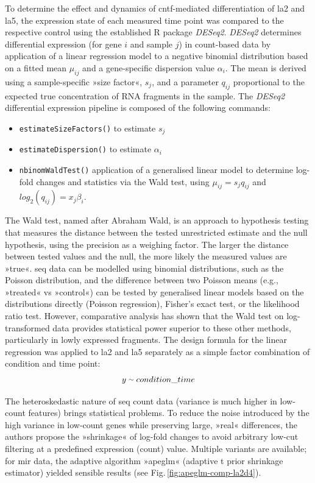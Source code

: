 \begin{method}
To determine the effect and dynamics of \ac{cntf}-mediated differentiation of \ac{la2} and \ac{la5}, the expression state of each measured time point was compared to the respective control using the established R package \textit{DESeq2}.\cite{Love2014} \textit{DESeq2} determines differential expression (for gene $i$ and sample $j$) in count-based data by application of a linear regression model to a negative binomial distribution based on a fitted mean $\mu_{ij}$ and a gene-specific dispersion value $\alpha_i$. The mean is derived using a sample-specific »size factor«, $s_j$, and a parameter $q_{ij}$ proportional to the expected true concentration of RNA fragments in the sample. The \textit{DESeq2} differential expression pipeline is composed of the following commands:
\begin{itemize}[noitemsep, leftmargin=.5cm, label={\tiny\raisebox{.5ex}{\textbullet}}]
\item \texttt{estimateSizeFactors()} to estimate $s_j$
\item \texttt{estimateDispersion()} to estimate $\alpha_i$
\item \texttt{nbinomWaldTest()} application of a generalised linear model to determine log-fold changes and statistics via the Wald test, using $\mu_{ij} = s_jq_{ij}$ and $log_2(q_{ij}) = x_j\beta_i$.
\end{itemize}
The Wald test, named after Abraham Wald,\cite{Wald1939} is an approach to hypothesis testing that measures the distance between the tested unrestricted estimate and the null hypothesis, using the precision as a weighing factor. The larger the distance between tested values and the null, the more likely the measured values are »true«. \ac{seq} data can be modelled using binomial distributions,\cite{Bullard2010} such as the Poisson distribution, and the difference between two Poisson means (e.g., »treated« vs »control«) can be tested by generalised linear models based on the distributions directly (Poisson regression), Fisher's exact test, or the likelihood ratio test. However, comparative analysis has shown that the Wald test on log-transformed data provides statistical power superior to these other methods,\cite{Chen2011} particularly in lowly expressed fragments. The design formula for the linear regression was applied to \ac{la2} and \ac{la5} separately as a simple factor combination of condition and time point: $$y \smallsim condition\_time$$

The heteroskedastic nature of \ac{seq} count data (variance is much higher in low-count features) brings statistical problems. To reduce the noise introduced by the high variance in low-count genes while preserving large, »real« differences, the authors propose the »shrinkage« of log-fold changes to avoid arbitrary low-cut filtering at a predefined expression (count) value. Multiple variants are available; for \ac{mir} data, the adaptive algorithm »apeglm«\cite{Zhu2019} (adaptive t prior shrinkage estimator) yielded sensible results (see Fig.\,\ref{fig:apeglm-comp-la2d4}).

\end{method}

